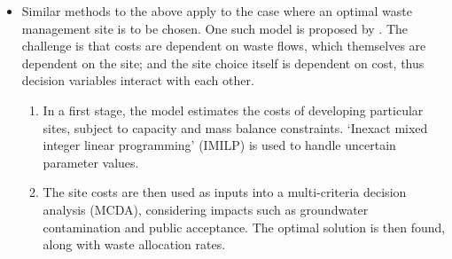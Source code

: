 \begin{itemize}
	\item Similar methods to the above apply to the case where an optimal waste management site is to be chosen. One such model is proposed by \citet{Cheng2003}. The challenge is that costs are dependent on waste flows, which themselves are dependent on the site; and the site choice itself is dependent on cost, thus decision variables interact with each other.
\begin{enumerate}
	\item In a first stage, the model estimates the costs of developing particular sites, subject to capacity and mass balance constraints. `Inexact mixed integer linear programming' (IMILP) is used to handle uncertain parameter values.
	\item The site costs are then used as inputs into a multi-criteria decision analysis (MCDA), considering impacts such as groundwater contamination and public acceptance. The optimal solution is then found, along with waste allocation rates.
\end{enumerate}
\end{itemize}


